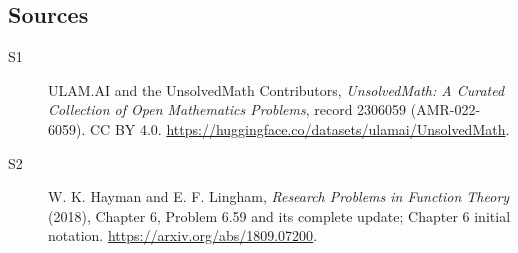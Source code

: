 \documentclass[11pt]{article}
\begin{document}
\subsection{Sources}
\begin{description}
\item[\hypertarget{source:2306059:1}{S1}] ULAM.AI and the UnsolvedMath Contributors, \emph{UnsolvedMath: A Curated Collection of Open Mathematics Problems}, record 2306059 (AMR-022-6059). CC BY 4.0. \url{https://huggingface.co/datasets/ulamai/UnsolvedMath}.
\item[\hypertarget{source:2306059:2}{S2}] W. K. Hayman and E. F. Lingham, \emph{Research Problems in Function Theory} (2018), Chapter 6, Problem 6.59 and its complete update; Chapter 6 initial notation. \url{https://arxiv.org/abs/1809.07200}.
\end{description}
\label{end:2306059}
\end{document}
